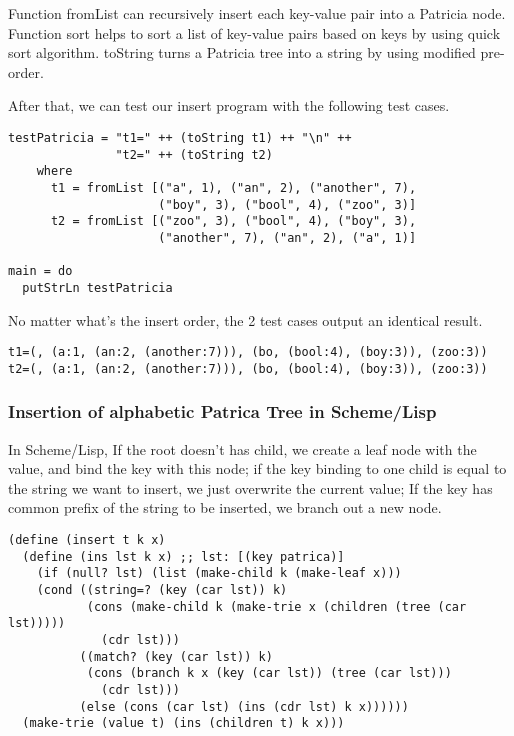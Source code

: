 \documentclass{article}
\begin{document}
Function fromList can recursively insert each key-value pair into a Patricia node.
Function sort helps to sort a list of key-value pairs based on keys by using quick sort
algorithm. toString turns a Patricia tree into a string by using modified pre-order.

After that, we can test our insert program with the following test cases.

\begin{lstlisting}
testPatricia = "t1=" ++ (toString t1) ++ "\n" ++
               "t2=" ++ (toString t2)
    where
      t1 = fromList [("a", 1), ("an", 2), ("another", 7),
                     ("boy", 3), ("bool", 4), ("zoo", 3)]
      t2 = fromList [("zoo", 3), ("bool", 4), ("boy", 3),
                     ("another", 7), ("an", 2), ("a", 1)]

main = do
  putStrLn testPatricia
\end{lstlisting}

No matter what's the insert order, the 2 test cases output an identical result.

\begin{verbatim}
t1=(, (a:1, (an:2, (another:7))), (bo, (bool:4), (boy:3)), (zoo:3))
t2=(, (a:1, (an:2, (another:7))), (bo, (bool:4), (boy:3)), (zoo:3))
\end{verbatim}


\subsubsection*{Insertion of alphabetic Patrica Tree in Scheme/Lisp}

In Scheme/Lisp, If the root doesn't has child, we create a leaf node
with the value, and bind the key with this node; if the key binding to
one child is equal to the string we want to insert, we just overwrite
the current value; If the key has common prefix of the string to be
inserted, we branch out a new node.

\lstset{language=lisp}
\begin{lstlisting}
(define (insert t k x)
  (define (ins lst k x) ;; lst: [(key patrica)]
    (if (null? lst) (list (make-child k (make-leaf x)))
	(cond ((string=? (key (car lst)) k)
	       (cons (make-child k (make-trie x (children (tree (car lst)))))
		     (cdr lst)))
	      ((match? (key (car lst)) k)
	       (cons (branch k x (key (car lst)) (tree (car lst)))
		     (cdr lst)))
	      (else (cons (car lst) (ins (cdr lst) k x))))))
  (make-trie (value t) (ins (children t) k x)))
\end{lstlisting}
\end{document}
